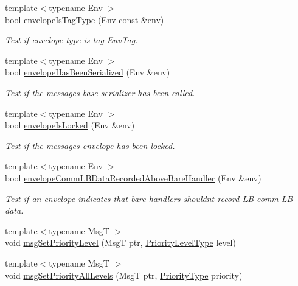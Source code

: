 \begin{DoxyCompactItemize}
{\footnotesize template$<$typename Env $>$ }\\bool \hyperlink{namespacevt_1_1messaging_a210f23c991eaf84274b744ac109ba72d}{envelope\+Is\+Tag\+Type} (Env const \&env)
\begin{DoxyCompactList}\small\item\em Test if envelope type is tag {\ttfamily Env\+Tag}. \end{DoxyCompactList}\item 
{\footnotesize template$<$typename Env $>$ }\\bool \hyperlink{namespacevt_1_1messaging_af984147f8c3e5bc9a34eb354ed2808d3}{envelope\+Has\+Been\+Serialized} (Env \&env)
\begin{DoxyCompactList}\small\item\em Test if the message\textquotesingle{}s base serializer has been called. \end{DoxyCompactList}\item 
{\footnotesize template$<$typename Env $>$ }\\bool \hyperlink{namespacevt_1_1messaging_a6129f4cbd5fd124f342d1235694f664d}{envelope\+Is\+Locked} (Env \&env)
\begin{DoxyCompactList}\small\item\em Test if the message\textquotesingle{}s envelope has been locked. \end{DoxyCompactList}\item 
{\footnotesize template$<$typename Env $>$ }\\bool \hyperlink{namespacevt_1_1messaging_adff184b8a112519f131399ff66cbbd54}{envelope\+Comm\+L\+B\+Data\+Recorded\+Above\+Bare\+Handler} (Env \&env)
\begin{DoxyCompactList}\small\item\em Test if an envelope indicates that bare handlers shouldn\textquotesingle{}t record LB comm LB data. \end{DoxyCompactList}\item 
{\footnotesize template$<$typename MsgT $>$ }\\void \hyperlink{namespacevt_1_1messaging_a5cca7f3fb7db0bfe14b3426ef9132090}{msg\+Set\+Priority\+Level} (MsgT ptr, \hyperlink{namespacevt_a53e07fdb3351b0f263e0dfd51b968d5e}{Priority\+Level\+Type} level)
\item 
{\footnotesize template$<$typename MsgT $>$ }\\void \hyperlink{namespacevt_1_1messaging_aae494e42c66a7b35346fd31d0100ebeb}{msg\+Set\+Priority\+All\+Levels} (MsgT ptr, \hyperlink{namespacevt_a86bff9f556eb761b27fc8600d006ac04}{Priority\+Type} priority)

\end{DoxyCompactItemize}

